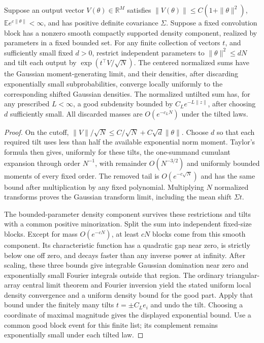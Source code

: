 \documentclass[11pt]{article}
\newcommand{\E}{\mathbb E}\newcommand{\R}{\mathbb R}
\begin{document}
\begin{lemma}\label{lem:local}
Suppose an output vector $V(\theta)\in\R^M$ satisfies
$\|V(\theta)\|\le C(1+\|\theta\|^2)$,
$\E e^{c\|\theta\|}<\infty$, and has positive definite covariance
$\Sigma$. Suppose a fixed convolution block has a nonzero smooth compactly
supported density component, realized by parameters in a fixed bounded
set. For any finite collection of vectors $t$, and sufficiently small
fixed $d>0$, restrict independent parameters to $\|\theta\|^2\le dN$
and tilt each output by $\exp(t^\top V/\sqrt N)$.
The centered normalized sums have the Gaussian moment-generating limit,
and their densities, after discarding exponentially small subprobabilities,
converge locally uniformly to the corresponding shifted Gaussian densities.
The normalized untilted sum has, for any prescribed $L<\infty$, a good
subdensity bounded by $C_L e^{-L\|z\|}$, after choosing $d$ sufficiently
small. All discarded masses are $O(e^{-c_LN})$ under the tilted laws.
\end{lemma}
\begin{proof}
On the cutoff, $\|V\|/\sqrt N\le C/\sqrt N+C\sqrt d\|\theta\|$.
Choose $d$ so that each required tilt uses less than half the available
exponential norm moment. Taylor's formula then gives, uniformly for
these tilts, the one-summand cumulant expansion through order $N^{-1}$,
with remainder $O(N^{-3/2})$ and uniformly bounded moments of every
fixed order. The removed tail is $O(e^{-c\sqrt N})$ and has the same
bound after multiplication by any fixed polynomial. Multiplying $N$
normalized transforms proves the Gaussian transform limit, including
the mean shift $\Sigma t$.

The bounded-parameter density component survives these restrictions and
tilts with a common positive minorization. Split the sum into independent
fixed-size blocks. Except for mass $O(e^{-cN})$, at least $cN$ blocks
come from this smooth component. Its characteristic function has a
quadratic gap near zero, is strictly below one off zero, and decays
faster than any inverse power at infinity. After scaling, these three
bounds give integrable Gaussian domination near zero and exponentially
small Fourier integrals outside that region. The ordinary triangular-array
central limit theorem and Fourier inversion yield the stated uniform
local density convergence and a uniform density bound for the good part.
Apply that bound under the finitely many tilts $t=\pm C_Le_i$ and undo
the tilt. Choosing a coordinate of maximal magnitude gives the displayed
exponential bound. Use a common good block event for this finite list;
its complement remains exponentially small under each tilted law.
\end{proof}
\end{document}
